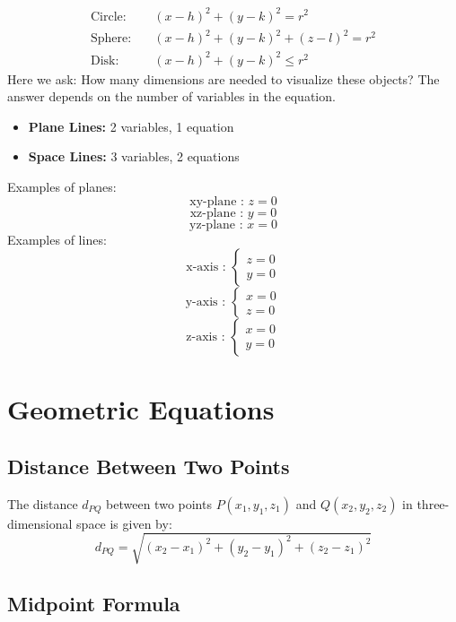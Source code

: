 \documentclass[a4paper,12pt,openany]{book}
\begin{document}
\begin{align*}
    \text{Circle:} \quad & (x-h)^2 + (y-k)^2 = r^2 \\
    \text{Sphere:} \quad & (x-h)^2 + (y-k)^2 + (z-l)^2 = r^2 \\
    \text{Disk:} \quad & (x-h)^2 + (y-k)^2 \leq r^2
\end{align*}
Here we ask: How many dimensions are needed to visualize these objects? The answer depends on the number of variables in the equation.

\begin{itemize}
    \item{\textbf{Plane Lines:} 2 variables, 1 equation}
    \item{\textbf{Space Lines:} 3 variables, 2 equations}
\end{itemize}
Examples of planes:
\[
\text{xy-plane : } z = 0
\]
\[
\text{xz-plane : } y = 0
\]
\[
\text{yz-plane : } x = 0
\]
Examples of lines:
\[
\text{x-axis : }
\begin{cases}
    z = 0\\
    y = 0
\end{cases}
\]
\[
\text{y-axis : }
\begin{cases}
    x = 0\\
    z = 0
\end{cases}
\]
\[
\text{z-axis : }
\begin{cases}
    x = 0\\
    y = 0
\end{cases}
\]
\pagebreak
\section{Geometric Equations}

\subsection{Distance Between Two Points}

The distance \(d_{PQ}\) between two points \( P(x_1, y_1, z_1) \) and \( Q(x_2, y_2, z_2) \) in three-dimensional space is given by:
\begin{equation}\label{Distance Between Two Points}
    d_{PQ} = \sqrt{(x_2 - x_1)^2 + (y_2 - y_1)^2 + (z_2 - z_1)^2}
\end{equation}

\subsection{Midpoint Formula}
\end{document}

